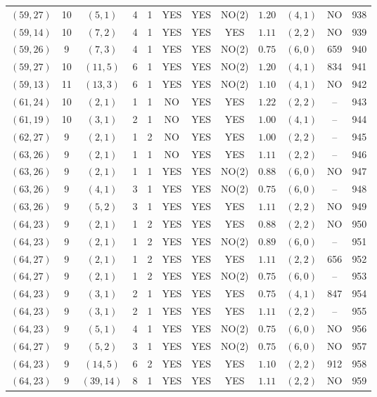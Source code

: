\begin{longtable}{|c|c|c|c|c|c|c|c|c|c|c|c|}
$(59,27)$ & 10 & $(5,1)$ & 4 & 1 & YES & YES & NO(2) & $1.20$ & $(4,1)$ & NO & 938\\
$(59,14)$ & 10 & $(7,2)$ & 4 & 1 & YES & YES & YES & $1.11$ & $(2,2)$ & NO & 939\\
$(59,26)$ & 9 & $(7,3)$ & 4 & 1 & YES & YES & NO(2) & $0.75$ & $(6,0)$ & 659 & 940\\
$(59,27)$ & 10 & $(11,5)$ & 6 & 1 & YES & YES & NO(2) & $1.20$ & $(4,1)$ & 834 & 941\\
$(59,13)$ & 11 & $(13,3)$ & 6 & 1 & YES & YES & NO(2) & $1.10$ & $(4,1)$ & NO & 942\\
$(61,24)$ & 10 & $(2,1)$ & 1 & 1 & NO & YES & YES & $1.22$ & $(2,2)$ & -- & 943\\
$(61,19)$ & 10 & $(3,1)$ & 2 & 1 & NO & YES & YES & $1.00$ & $(4,1)$ & -- & 944\\
$(62,27)$ & 9 & $(2,1)$ & 1 & 2 & NO & YES & YES & $1.00$ & $(2,2)$ & -- & 945\\
$(63,26)$ & 9 & $(2,1)$ & 1 & 1 & NO & YES & YES & $1.11$ & $(2,2)$ & -- & 946\\
$(63,26)$ & 9 & $(2,1)$ & 1 & 1 & YES & YES & NO(2) & $0.88$ & $(6,0)$ & NO & 947\\
$(63,26)$ & 9 & $(4,1)$ & 3 & 1 & YES & YES & NO(2) & $0.75$ & $(6,0)$ & -- & 948\\
$(63,26)$ & 9 & $(5,2)$ & 3 & 1 & YES & YES & YES & $1.11$ & $(2,2)$ & NO & 949\\
$(64,23)$ & 9 & $(2,1)$ & 1 & 2 & YES & YES & YES & $0.88$ & $(2,2)$ & NO & 950\\
$(64,23)$ & 9 & $(2,1)$ & 1 & 2 & YES & YES & NO(2) & $0.89$ & $(6,0)$ & -- & 951\\
$(64,27)$ & 9 & $(2,1)$ & 1 & 2 & YES & YES & YES & $1.11$ & $(2,2)$ & 656 & 952\\
$(64,27)$ & 9 & $(2,1)$ & 1 & 2 & YES & YES & NO(2) & $0.75$ & $(6,0)$ & -- & 953\\
$(64,23)$ & 9 & $(3,1)$ & 2 & 1 & YES & YES & YES & $0.75$ & $(4,1)$ & 847 & 954\\
$(64,23)$ & 9 & $(3,1)$ & 2 & 1 & YES & YES & YES & $1.11$ & $(2,2)$ & -- & 955\\
$(64,23)$ & 9 & $(5,1)$ & 4 & 1 & YES & YES & NO(2) & $0.75$ & $(6,0)$ & NO & 956\\
$(64,27)$ & 9 & $(5,2)$ & 3 & 1 & YES & YES & NO(2) & $0.75$ & $(6,0)$ & NO & 957\\
$(64,23)$ & 9 & $(14,5)$ & 6 & 2 & YES & YES & YES & $1.10$ & $(2,2)$ & 912 & 958\\
$(64,23)$ & 9 & $(39,14)$ & 8 & 1 & YES & YES & YES & $1.11$ & $(2,2)$ & NO & 959\\

\end{longtable}
